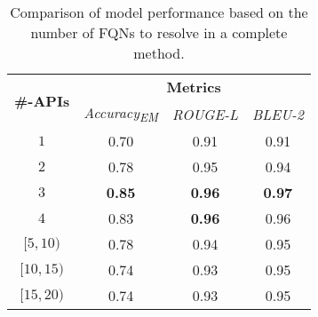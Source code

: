 \begin{table}[]
\centering
\begin{tabular}{l|ccc}
\toprule
\multirow{2}{*}{\textbf{\#-APIs}} & \multicolumn{3}{c}{\textbf{Metrics}}                                  \\ \cline{2-4} 
                                   & \multicolumn{1}{c|}{\textit{Accuracy\textsubscript{EM}}} & \multicolumn{1}{c|}{\textit{ROUGE-L}} &  \multicolumn{1}{c}{\textit{BLEU-2}}\\ \hline
\multicolumn{1}{c|}{$1$}      & \multicolumn{1}{c|}{0.70}         & \multicolumn{1}{c|}{0.91} & 0.91           \\
\multicolumn{1}{c|}{$2$}      & \multicolumn{1}{c|}{0.78}         & \multicolumn{1}{c|}{0.95} & 0.94          \\ 
\multicolumn{1}{c|}{$3$}      & \multicolumn{1}{c|}{\textbf{0.85}}         & \multicolumn{1}{c|}{\textbf{0.96}} & \textbf{0.97}          \\ 
\multicolumn{1}{c|}{$4$}      & \multicolumn{1}{c|}{0.83}         & \multicolumn{1}{c|}{\textbf{0.96}} & 0.96        \\ 
\multicolumn{1}{c|}{$[5, 10)$}      & \multicolumn{1}{c|}{0.78}         & \multicolumn{1}{c|}{0.94} & 0.95          \\ 
\multicolumn{1}{c|}{$[10, 15)$}      & \multicolumn{1}{c|}{0.74}         & \multicolumn{1}{c|}{0.93} & 0.95          \\ 
\multicolumn{1}{c|}{$[15, 20)$}      & \multicolumn{1}{c|}{0.74}         & \multicolumn{1}{c|}{0.93} & 0.95         \\ \bottomrule
\end{tabular}
\caption{Comparison of model performance based on the number of FQNs to resolve in a complete method.}
\label{tab:strat-eval}
\end{table}